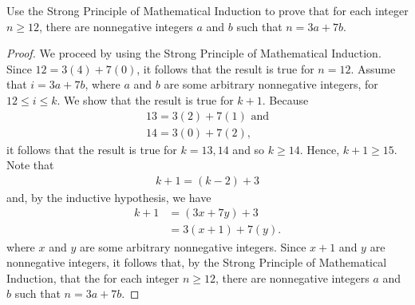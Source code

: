 \documentclass[12pt]{article}
\newenvironment{problem}[2][Problem]{\begin{trivlist}
		\item[\hskip \labelsep {\bfseries #1}\hskip \labelsep {\bfseries #2.}]}{\end{trivlist}}
\begin{document}
	\begin{problem}{45}
		Use the Strong Principle of Mathematical Induction to prove that for each integer $n\geq 12$, there are nonnegative integers $a$ and $b$ such that $n=3a+7b$.
		\begin{proof}
			We proceed by using the Strong Principle of Mathematical Induction. Since $12 = 3(4) + 7(0)$, it follows that the result is true for $n=12$. Assume that $i = 3a + 7b$, where $a$ and $b$ are some arbitrary nonnegative integers, for $12 \leq i \leq k$. We show that the result is true for $k+1$. Because 
			\begin{align*}
			13 = 3(2) + 7(1) \text{ and}\\ 
			14 = 3(0) + 7(2),
		\end{align*}
			  it follows that the result is true for $k=13,14$ and so $k\geq 14$. Hence, $k+1\geq 15$. Note that
			  \begin{align*}
			  	k+1 = (k-2) + 3
			  \end{align*}
		  and, by the inductive hypothesis, we have
		  		\begin{align*}
		  			k+1 &= (3x + 7y) + 3\\
		  				&= 3(x+1) + 7(y). 
		  		\end{align*}
	  		where $x$ and $y$ are some arbitrary nonnegative integers.
	  		Since $x+1$ and $y$ are nonnegative integers, it follows that, by the Strong Principle of Mathematical Induction, that the for each integer $n\geq 12$, there are nonnegative integers $a$ and $b$ such that $n=3a+7b$.
		\end{proof}
	\end{problem}
\end{document}
